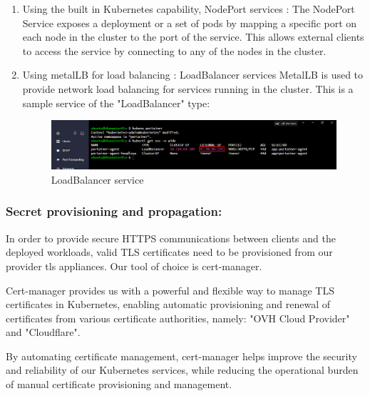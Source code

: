 \begin{enumerate}[label = (\alph*)]

\item Using the built in Kubernetes capability, NodePort services : The NodePort Service exposes a deployment or a set of pods by mapping a specific port on each node in the cluster to the port of the service. 
This allows external clients to access the service by connecting to any of the nodes in the cluster.

\item Using metalLB for load balancing : LoadBalancer services 
MetalLB is used to provide network load balancing for services running in the cluster. This is a sample service of the "LoadBalancer" type: 

\begin{figure}[H]\centering
\includegraphics[width=1.0\textwidth,angle=00]{assets/f23.png}
\caption{LoadBalancer service }
\label{fig:LoadBalancer}
\end{figure}

\end{enumerate}


\subsubsection{Secret provisioning and propagation:}


In order to provide secure HTTPS communications between clients and the deployed workloads, valid TLS certificates need to be provisioned from our provider tls appliances. Our tool of choice is cert-manager.

Cert-manager provides us with a powerful and flexible way to manage TLS certificates in Kubernetes, enabling automatic provisioning and renewal of certificates from various certificate authorities, namely: "OVH Cloud Provider" and "Cloudflare".

By automating certificate management, cert-manager helps improve the security and reliability of our Kubernetes services, while reducing the operational burden of manual certificate provisioning and management.


